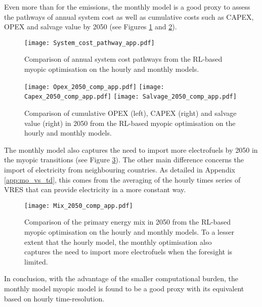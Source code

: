

Even more than for the emissions, the monthly model is a good proxy to assess the pathways of annual system cost as well as cumulative costs such as CAPEX, OPEX and salvage value by 2050 (see Figures \ref{fig:app:System_cost_pathway} and \ref{fig:app:Opex_Capex_Salvage_comp}).

\begin{figure}[!htbp]
\centering
\texttt{[image: System\_cost\_pathway\_app.pdf]}
\caption{Comparison of annual system cost pathways from the \gls{RL}-based myopic optimisation on the hourly and monthly models.}
\label{fig:app:System_cost_pathway}
\end{figure}

\begin{figure}[!htbp]
\centering
\texttt{[image: Opex\_2050\_comp\_app.pdf]}
\texttt{[image: Capex\_2050\_comp\_app.pdf]}
\texttt{[image: Salvage\_2050\_comp\_app.pdf]}
\caption{Comparison of cumulative OPEX (left), CAPEX (right) and salvage value (right) in 2050 from the \gls{RL}-based myopic optimisation on the hourly and monthly models.}
\label{fig:app:Opex_Capex_Salvage_comp}
\end{figure}

\newpage
The monthly model also captures the need to import more electrofuels by 2050 in the myopic transitions (see Figure \ref{fig:app:Mix_2050_comp}). The other main difference concerns the import of electricity from neighbouring countries. As detailed in Appendix \ref{app:mo_vs_td}, this comes from the averaging of the hourly times series of \gls{VRES} that can provide electricity in a more constant way.

\begin{figure}[!htbp]
\centering
\texttt{[image: Mix\_2050\_comp\_app.pdf]}
\caption{Comparison of the primary energy mix in 2050 from the \gls{RL}-based myopic optimisation on the hourly and monthly models. To a lesser extent that the hourly model, the monthly optimisation also captures the need to import more electrofuels when the foresight is limited.}
\label{fig:app:Mix_2050_comp}
\end{figure}

In conclusion, with the advantage of the smaller computational burden, the monthly model myopic model is found to be a good proxy with its equivalent based on hourly time-resolution.